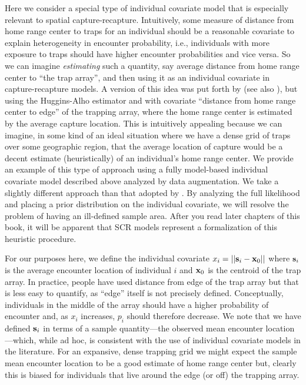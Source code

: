 Here we consider a special type of individual covariate model that is
especially relevant to spatial capture-recapture.  Intuitively, some
measure of distance from home range center to traps for an individual
should be a reasonable covariate to explain heterogeneity in encounter
probability, i.e., individuals with more exposure to traps should have
higher encounter probabilities and vice versa. So we can imagine {\it
  estimating} such a quantity, say average distance from home range
center to ``the trap array'', and then using it as an individual
covariate in capture-recapture models.  A version of this idea was put
forth by \citet{boulanger_mclellan:2001} (see also \citet{ivan:2012}),
but using the Huggins-Alho estimator and with covariate ``distance
from home range center to edge'' of the trapping array, where the home
range center is estimated by the average capture location.  This is
intuitively appealing because we can imagine, in some kind of an ideal
situation where we have a dense grid of traps over some geographic
region, that the average location of capture would be a decent
estimate (heuristically) of an individual's home range center.  We
provide an example of this type of approach
using a fully model-based individual covariate model described above
analyzed by data augmentation. We take a slightly different approach
than that adopted by \citet{boulanger_mclellan:2001}. By analyzing the
full likelihood and placing a prior distribution on the individual
covariate, we will resolve the problem of having an ill-defined
sample area.  After you read later chapters of this book, it will be
apparent that SCR models represent a formalization of this heuristic
procedure.





For our purposes here, we define the individual covariate $x_{i} = ||{\bf s}_{i} - {\bf
  x}_{0}||$ where ${\bf s}_{i}$ is the average encounter location of
individual $i$ and ${\bf x}_{0}$ is the centroid of the trap array.
In practice, people have
used distance from edge of the trap array but that is less easy to
quantify, as ``edge'' itself is not precisely defined.
Conceptually, individuals in the middle of the array should have a
higher probability of encounter and, as $x_{i}$ increases, $p_{i}$
should therefore decrease. We note that we have defined ${\bf s}_{i}$
in terms of a sample quantity---the observed mean encounter
location---which, while ad hoc,
is consistent with the use of individual covariate models
 in the literature.  For an
expansive, dense trapping grid we might expect the sample mean
encounter location to be a good estimate of home range center but,
clearly this is biased for individuals that live around the edge (or
off) the trapping array.


